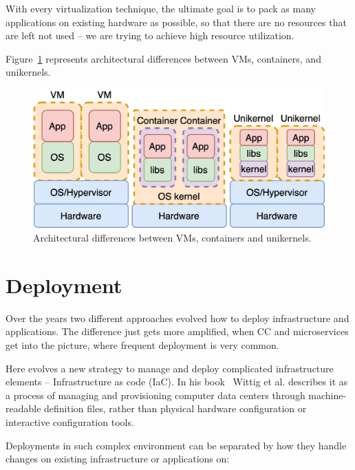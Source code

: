 \noindent
With every virtualization technique, the ultimate goal is to pack as many applications on existing hardware as possible, so that there are no resources that are left not used -- we are trying to achieve high resource utilization. 

Figure~\ref{fig:fig5} represents architectural differences between VMs, containers, and unikernels.

\begin{figure}[H]
	\begin{center}
		\includegraphics[scale=0.9]{images/Figure5.png}
	\end{center}
	\vspace{-0.6cm}
	\caption{Architectural differences between VMs, containers and unikernels.}
	\label{fig:fig5}
\end{figure}
%
%
\section{Deployment}\label{sec:deployment}
%
Over the years two different approaches evolved how to deploy infrastructure and applications. The difference just gets more amplified, when CC and microservices get into the picture, where frequent deployment is very common. 

Here evolves a new strategy to manage and deploy complicated infrastructure elements -- Infrastructure as code (IaC). In his book~\cite{wittig2018amazon} Wittig et al. describes it as a process of managing and provisioning computer data centers through machine-readable definition files, rather than physical hardware configuration or interactive configuration tools.

Deployments in such complex environment can be separated by how they handle changes on existing infrastructure or applications on:

